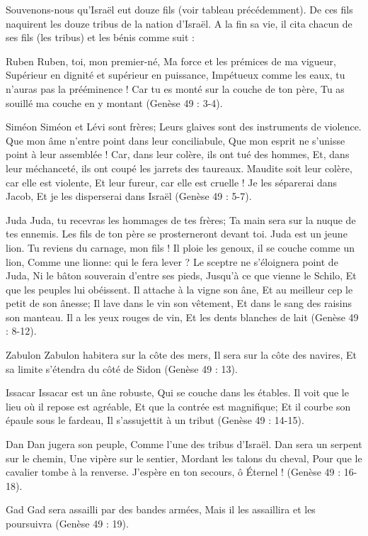 Souvenons-nous qu'Israël eut douze fils (voir tableau précédemment). De ces fils naquirent les douze tribus de la nation d'Israël. A la fin sa vie, il cita chacun de ses fils (les tribus) et les bénis comme suit :

Ruben
Ruben, toi, mon premier-né, Ma force et les prémices de ma vigueur, Supérieur en dignité et supérieur en puissance, Impétueux comme les eaux, tu n'auras pas la prééminence ! Car tu es monté sur la couche de ton père, Tu as souillé ma couche en y montant (Genèse 49 : 3-4).

Siméon
Siméon et Lévi sont frères; Leurs glaives sont des instruments de violence. Que mon âme n'entre point dans leur conciliabule, Que mon esprit ne s'unisse point à leur assemblée ! Car, dans leur colère, ils ont tué des hommes, Et, dans leur méchanceté, ils ont coupé les jarrets des taureaux. Maudite soit leur colère, car elle est violente, Et leur fureur, car elle est cruelle ! Je les séparerai dans Jacob, Et je les disperserai dans Israël (Genèse 49 : 5-7).

Juda
Juda, tu recevras les hommages de tes frères; Ta main sera sur la nuque de tes ennemis. Les fils de ton père se prosterneront devant toi. Juda est un jeune lion. Tu reviens du carnage, mon fils ! Il ploie les genoux, il se couche comme un lion, Comme une lionne: qui le fera lever ? Le sceptre ne s'éloignera point de Juda, Ni le bâton souverain d'entre ses pieds, Jusqu'à ce que vienne le Schilo, Et que les peuples lui obéissent. Il attache à la vigne son âne, Et au meilleur cep le petit de son ânesse; Il lave dans le vin son vêtement, Et dans le sang des raisins son manteau. Il a les yeux rouges de vin, Et les dents blanches de lait (Genèse 49 : 8-12).
 
Zabulon
Zabulon habitera sur la côte des mers, Il sera sur la côte des navires, Et sa limite s'étendra du côté de Sidon (Genèse 49 : 13).

Issacar
Issacar est un âne robuste, Qui se couche dans les étables. Il voit que le lieu où il repose est agréable, Et que la contrée est magnifique; Et il courbe son épaule sous le fardeau, Il s'assujettit à un tribut (Genèse 49 : 14-15).

Dan
Dan jugera son peuple, Comme l'une des tribus d'Israël. Dan sera un serpent sur le chemin, Une vipère sur le sentier, Mordant les talons du cheval, Pour que le cavalier tombe à la renverse. J'espère en ton secours, ô Éternel ! (Genèse 49 : 16-18).

Gad
Gad sera assailli par des bandes armées, Mais il les assaillira et les poursuivra (Genèse 49 : 19).

